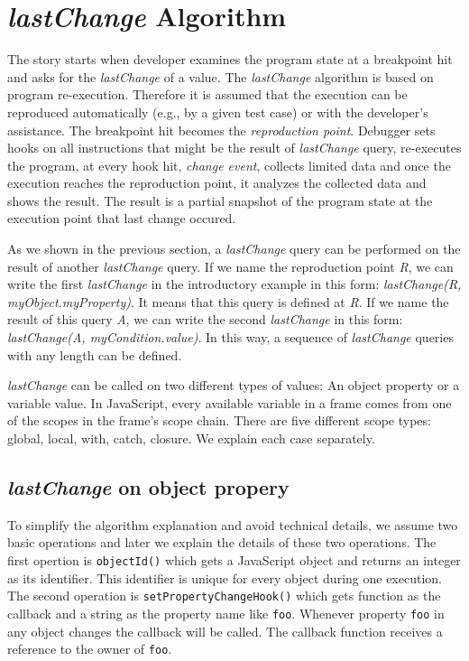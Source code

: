 \documentclass[preprint]{sigplanconf}
\begin{document}
\section{\textit{lastChange} Algorithm}

The story starts when developer examines the program state at a breakpoint hit and asks for the \textit{lastChange} of a value. The \textit{lastChange} algorithm is based on program re-execution. Therefore it is assumed that the execution can be reproduced automatically (e.g., by a given test case) or with the developer's assistance. The breakpoint hit becomes the \textit{reproduction point}. Debugger sets hooks on all instructions that might be the result of \textit{lastChange} query, re-executes the program, at every hook hit, \textit{change event}, collects limited data and once the execution reaches the reproduction point, it analyzes the collected data and shows the result. The result is a partial snapshot of the program state at the execution point that last change occured. 

As we shown in the previous section, a \textit{lastChange} query can be performed on the result of another \textit{lastChange} query. If we name the reproduction point \textit{R}, we can write the first \textit{lastChange} in the introductory example in this form: \textit{lastChange(R, myObject.myProperty)}. It means that this query is defined at \textit{R}. If we name the result of this query \textit{A}, we can write the second \textit{lastChange} in this form: \textit{lastChange(A, myCondition.value)}. In this way, a sequence of \textit{lastChange} queries with any length can be defined.

\textit{lastChange} can be called on two different types of values: An object property or a variable value. In JavaScript, every available variable in a frame comes from one of the scopes in the frame's scope chain. There are five different scope types: global, local, with, catch, closure. We explain each case separately.

\subsection{\textit{lastChange} on object propery}
To simplify the algorithm explanation and avoid technical details, we assume two basic operations and later we explain the details of these two operations. The first opertion is \texttt{objectId()} which gets a JavaScript object and returns an integer as its identifier. This identifier is unique for every object during one execution. The second operation is \texttt{setPropertyChangeHook()} which gets function as the callback and a string as the property name like \texttt{foo}. Whenever property \texttt{foo} in any object changes the callback will be called. The callback function receives a reference to the owner of \texttt{foo}.
\end{document}
